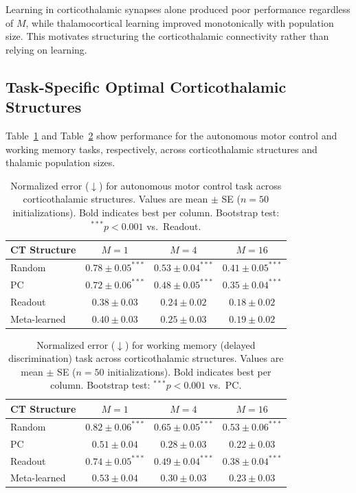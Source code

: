 \documentclass[11pt]{article}
\begin{document}
Learning in corticothalamic synapses alone produced poor performance regardless of $M$, while thalamocortical learning improved monotonically with population size. This motivates structuring the corticothalamic connectivity rather than relying on learning.

\subsection{Task-Specific Optimal Corticothalamic Structures}

Table~\ref{tab:motor_task} and Table~\ref{tab:wm_task} show performance for the autonomous motor control and working memory tasks, respectively, across corticothalamic structures and thalamic population sizes.

\begin{table}[H]
\centering
\caption{Normalized error ($\downarrow$) for autonomous motor control task across corticothalamic structures. Values are mean $\pm$ SE ($n = 50$ initializations). Bold indicates best per column. Bootstrap test: $^{***}p<0.001$ vs.\ Readout.}
\label{tab:motor_task}
\begin{tabular}{lccc}
\toprule
CT Structure & $M = 1$ & $M = 4$ & $M = 16$ \\
\midrule
Random & $0.78 \pm 0.05^{***}$ & $0.53 \pm 0.04^{***}$ & $0.41 \pm 0.05^{***}$ \\
PC & $0.72 \pm 0.06^{***}$ & $0.48 \pm 0.05^{***}$ & $0.35 \pm 0.04^{***}$ \\
Readout & $\mathbf{0.38 \pm 0.03}$ & $\mathbf{0.24 \pm 0.02}$ & $\mathbf{0.18 \pm 0.02}$ \\
Meta-learned & $0.40 \pm 0.03$ & $0.25 \pm 0.03$ & $0.19 \pm 0.02$ \\
\bottomrule
\end{tabular}
\end{table}

\begin{table}[H]
\centering
\caption{Normalized error ($\downarrow$) for working memory (delayed discrimination) task across corticothalamic structures. Values are mean $\pm$ SE ($n = 50$ initializations). Bold indicates best per column. Bootstrap test: $^{***}p<0.001$ vs.\ PC.}
\label{tab:wm_task}
\begin{tabular}{lccc}
\toprule
CT Structure & $M = 1$ & $M = 4$ & $M = 16$ \\
\midrule
Random & $0.82 \pm 0.06^{***}$ & $0.65 \pm 0.05^{***}$ & $0.53 \pm 0.06^{***}$ \\
PC & $\mathbf{0.51 \pm 0.04}$ & $\mathbf{0.28 \pm 0.03}$ & $\mathbf{0.22 \pm 0.03}$ \\
Readout & $0.74 \pm 0.05^{***}$ & $0.49 \pm 0.04^{***}$ & $0.38 \pm 0.04^{***}$ \\
Meta-learned & $0.53 \pm 0.04$ & $0.30 \pm 0.03$ & $0.23 \pm 0.03$ \\
\bottomrule
\end{tabular}
\end{table}
\end{document}
